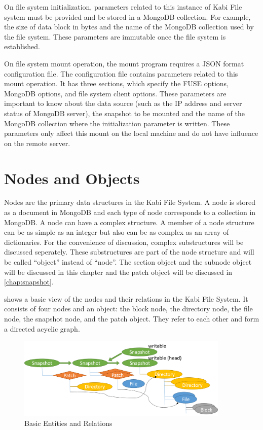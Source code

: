     On file system initialization, parameters related to this instance of Kabi File system must be provided and be stored in a MongoDB collection. For example, the size of data block in bytes and the name of the MongoDB collection used by the file system. These parameters are immutable once the file system is established.

    On file system mount operation, the mount program requires a JSON format configuration file. The configuration file contains parameters related to this mount operation. It has three sections, which specify the FUSE options, MongoDB options, and file system client options. These parameters are important to know about the data source (such as the IP address and server status of MongoDB server), the snapshot to be mounted and the name of the MongoDB collection where the initialization parameter is written. These parameters only affect this mount on the local machine and do not have influence on the remote server.

\section{Nodes and Objects}

    Nodes are the primary data structures in the Kabi File System. A node is stored as a document in MongoDB and each type of node corresponds to a collection in MongoDB. A node can have a complex structure. A member of a node structure can be as simple as an integer but also can be as complex as an array of dictionaries. For the convenience of discussion, complex substructures will be discussed seperately. These substructures are part of the node structure and will be called ``object'' instead of ``node''. The section object and the subnode object will be discussed in this chapter and the patch object will be discussed in \cref{chap:snapshot}.

     shows a basic view of the nodes and their relations in the Kabi File System. It consists of four nodes and an object: the block node, the directory node, the file node, the snapshot node, and the patch object. They refer to each other and form a directed acyclic graph. 

\begin{figure}[t]
\centering
\includegraphics[width=0.9\textwidth]{Chapter-3/figs/fig2.png}
\caption{Basic Entities and Relations}
\label{fig:basic_entities}
\end{figure}

